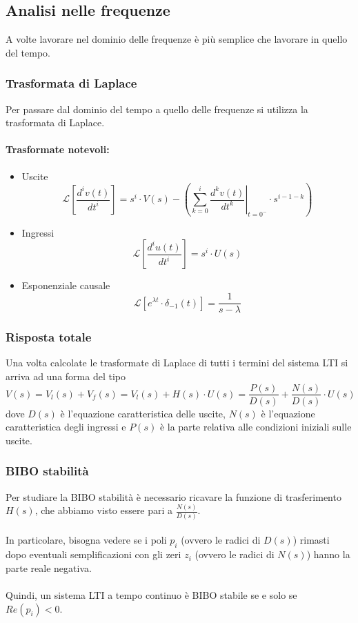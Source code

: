 \documentclass[a4paper]{article}
\begin{document}
	\subsection{Analisi nelle frequenze}
	A volte lavorare nel dominio delle frequenze è più semplice che lavorare in quello del tempo.

	\subsubsection{Trasformata di Laplace}
	Per passare dal dominio del tempo a quello delle frequenze si utilizza la trasformata di Laplace.
	\paragraph{Trasformate notevoli:}
	\begin{itemize}
		\item Uscite
			\[
			\mathcal{L} \left[ \frac{d^{i} v(t)}{dt^{i}} \right] = s^i \cdot V(s) - \left( \sum_{k=0}^i \left. \frac{d^{k} v(t)}{dt^{k}} \right|_{t=0^-} \cdot s^{i-1-k} \right)
			\]
		\item Ingressi
			\[
			\mathcal{L} \left[ \frac{d^{i} u(t)}{dt^{i}} \right] = s^i \cdot U(s)
			\]
		\item Esponenziale causale
			\[
			\mathcal{L} \left[ e^{\lambda t} \cdot \delta_{-1}(t) \right] = \frac{1}{s - \lambda}
			\]
	\end{itemize}
	
	\subsubsection{Risposta totale}
	Una volta calcolate le trasformate di Laplace di tutti i termini del sistema LTI si arriva ad una forma del tipo
	\[
	V(s) = V_l(s) + V_f(s) = V_l(s) + H(s) \cdot U(s) = \frac{P(s)}{D(s)} + \frac{N(s)}{D(s)} \cdot U(s)
	\]
	dove $D(s)$ è l'equazione caratteristica delle uscite, $N(s)$ è l'equazione caratteristica degli ingressi e $P(s)$ è la parte relativa alle condizioni iniziali sulle uscite.
	
	\subsubsection{BIBO stabilità}
	Per studiare la BIBO stabilità è necessario ricavare la funzione di trasferimento $H(s)$, che abbiamo visto essere pari a $\frac{N(s)}{D(s)}$.
	\\ \\
	In particolare, bisogna vedere se i poli $p_i$ (ovvero le radici di $D(s)$) rimasti dopo eventuali semplificazioni con gli zeri $z_i$ (ovvero le radici di $N(s)$) hanno la parte reale negativa.
	\\ \\
	Quindi, un sistema LTI a tempo continuo è BIBO stabile se e solo se $Re(p_i)<0$.
	
\end{document}
